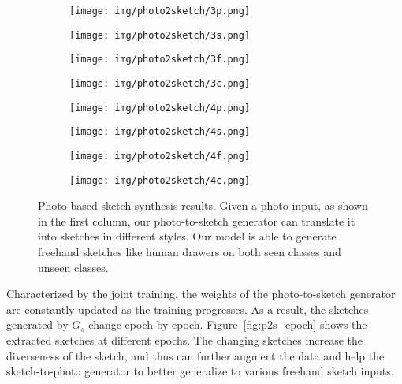 \documentclass[10pt,twocolumn,letterpaper]{article}
\begin{document}
\begin{figure}[tbp]
\begin{center}
  \begin{subfigure}[b]{\ptswidth\linewidth}
  \texttt{[image: img/photo2sketch/3p.png]}
\end{subfigure}
  \begin{subfigure}[b]{\ptswidth\linewidth}
  \texttt{[image: img/photo2sketch/3s.png]}
\end{subfigure}
\begin{subfigure}[b]{\ptswidth\linewidth}
  \texttt{[image: img/photo2sketch/3f.png]}
\end{subfigure}
  \begin{subfigure}[b]{\ptswidth\linewidth}
  \texttt{[image: img/photo2sketch/3c.png]}
\end{subfigure}
  
  \begin{subfigure}[b]{\ptswidth\linewidth}
  \texttt{[image: img/photo2sketch/4p.png]}
  \end{subfigure}
  \begin{subfigure}[b]{\ptswidth\linewidth}
  \texttt{[image: img/photo2sketch/4s.png]}
  \end{subfigure}
\begin{subfigure}[b]{\ptswidth\linewidth}
  \texttt{[image: img/photo2sketch/4f.png]}
  \end{subfigure}
  \begin{subfigure}[b]{\ptswidth\linewidth}
  \texttt{[image: img/photo2sketch/4c.png]}
  \end{subfigure}
\end{center}
\caption{Photo-based sketch synthesis results. Given a photo input, as shown in the first column, our photo-to-sketch generator can translate it into sketches in different styles. Our model is able to generate freehand sketches like human drawers on both seen classes and unseen classes.}
 \label{fig:photo_to_sketch}
\end{figure}

Characterized by the joint training, the weights of the photo-to-sketch generator are constantly updated as the training progresses. As a result, the sketches generated by $G_{s}$ change epoch by epoch. Figure~\ref{fig:p2s_epoch} shows the extracted sketches at different epochs. The changing sketches increase the diverseness of the sketch, and thus can further augment the data and help the sketch-to-photo generator to better generalize to various freehand sketch inputs.
\end{document}
